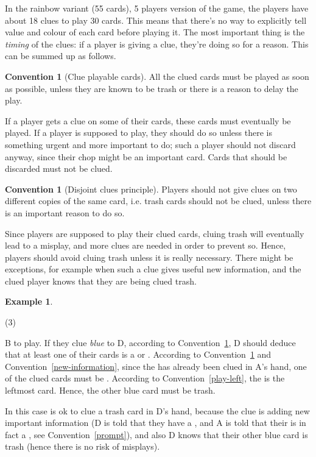 \documentclass[a4paper]{article}
\theoremstyle{plain}
\theoremstyle{definition}
\newtheorem{example}[theorem]{Example}
\newtheorem{convention}[theorem]{Convention}
\begin{document}
In the rainbow variant (55 cards), 5 players version of the game, the players have about 18 clues to play 30 cards. This means that there's no way to explicitly tell value and colour of each card before playing it. The most important thing is the \textit{timing} of the clues: if a player is giving a clue, they're doing so for a reason. This can be summed up as follows.

\begin{convention}[Clue playable cards]
	\label{clue-playable-cards}
	All the clued cards must be played as soon as possible, unless they are known to be trash or there is a reason to delay the play.
\end{convention}

If a player gets a clue on some of their cards, these cards must eventually be played. If a player is supposed to play, they should do so unless there is something urgent and more important to do; such a player should not discard anyway, since their chop might be an important card. Cards that should be discarded must not be clued.

\begin{convention}[Disjoint clues principle]
	\label{disjoint-clues}
	Players should not give clues on two different copies of the same card, i.e. trash cards should not be clued, unless there is an important reason to do so.
\end{convention}

Since players are supposed to play their clued cards, cluing trash will eventually lead to a misplay, and more clues are needed in order to prevent so. Hence, players should avoid cluing trash unless it is really necessary. There might be exceptions, for example when such a clue gives useful new information, and the clued player knows that they are being clued trash.

\begin{example}
	\hfill
	\begin{tasks}(3)
		\task[+]      
		\task[A]    
		\task[B]    
		\task[C]    
		\task[D]    
		\task[E]    
	\end{tasks}

	B to play. If they clue \textit{blue} to D, according to Convention~\ref{clue-playable-cards}, D should deduce that at least one of their cards is a  or . According to Convention~\ref{disjoint-clues} and Convention~\ref{new-information}, since the  has already been clued in A's hand, one of the clued cards must be . According to Convention~\ref{play-left}, the  is the leftmost card. Hence, the other blue card must be trash.
	
	In this case is ok to clue a trash card in D's hand, because the clue is adding new important information (D is told that they have a , and A is told that their  is in fact a , see Convention~\ref{prompt}), and also D knows that their other blue card is trash (hence there is no risk of misplays).
\end{example}
\end{document}
